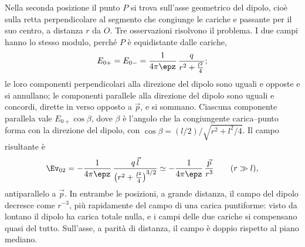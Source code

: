 \documentclass[main.tex]{subfiles}
\begin{document}
Nella seconda posizione il punto $P$ si trova sull'asse geometrico del dipolo, cioè sulla retta perpendicolare al segmento che congiunge le cariche e passante per il suo centro, a distanza $r$ da $O$. Tre osservazioni risolvono il problema. I due campi hanno lo stesso modulo, perché $P$ è equidistante dalle cariche,
\[
E_{0+}=E_{0-}=\frac{1}{4\pi\epz}\,\frac{q}{r^{2}+\frac{l^{2}}{4}} ;
\]
le loro componenti perpendicolari alla direzione del dipolo sono uguali e opposte e si annullano; le componenti parallele alla direzione del dipolo sono uguali e concordi, dirette in verso opposto a $\vec p$, e si sommano. Ciascuna componente parallela vale $E_{0+}\cos\beta$, dove $\beta$ è l'angolo che la congiungente carica--punto forma con la direzione del dipolo, con $\cos\beta=(l/2)/\sqrt{r^2+l^2/4}$. Il campo risultante è
\[
\Ev_{02}=-\frac{1}{4\pi\epz}\,\frac{q\,\vec l}{\left(r^2+\frac{l^2}{4}\right)^{3/2}}\simeq-\frac{1}{4\pi\epz}\,\frac{\vec p}{r^3}\qquad(r\gg l),
\]
antiparallelo a $\vec p$. In entrambe le posizioni, a grande distanza, il campo del dipolo decresce come $r^{-3}$, più rapidamente del campo di una carica puntiforme: visto da lontano il dipolo ha carica totale nulla, e i campi delle due cariche si compensano quasi del tutto. Sull'asse, a parità di distanza, il campo è doppio rispetto al piano mediano.
\end{document}
